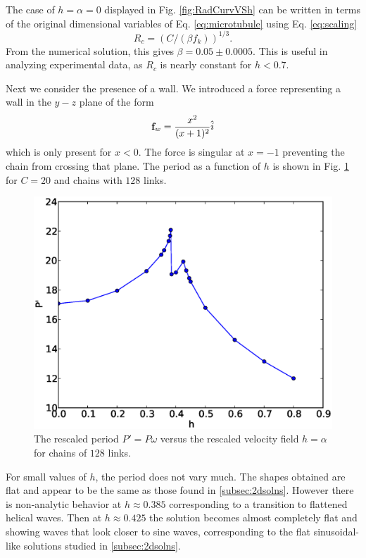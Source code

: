 \documentclass[11pt]{ucthesis}
\begin{document}
The case of $h = \alpha = 0$ displayed in Fig.  \ref{fig:RadCurvVSh} can be written in terms of the original
dimensional variables of Eq. \ref{eq:microtubule} using Eq.  \ref{eq:scaling}
\begin{equation}
\label{eq:R}
R_c =  (C/(\beta f_k))^{1/3}.
\end{equation}
From the numerical solution, this gives $\beta = 0.05 \pm 0.0005$. This is useful in analyzing experimental data, as
$R_c$ is nearly constant for $h < 0.7$.

Next we consider the presence of a wall. We introduced a force representing a wall in the $y-z$ plane of the form
\begin{equation}
\label{eq:wallforce}
{\bf f}_w =  \frac{x^2}{(x+1)^2} { \hat  i}  
\end{equation}
which is only present for $x < 0$. The force is singular at $x=-1$ preventing the chain from crossing that plane.
The period as a function of $h$ is shown in Fig. \ref{fig:WallPeriodVSh} for $C=20$ and chains with $128$ links.
\begin{figure}[htp]
\begin{center}
\includegraphics[width=\hsize]{wall_per_vs_h.eps}
\caption{ 
The rescaled period $P' = P\omega$ versus the rescaled velocity field $h=\alpha$
for chains of $128$ links.
}
\label{fig:WallPeriodVSh}
\end{center}
\end{figure}

For small values of $h$, the period does not vary much. The shapes obtained are flat and
appear to be the same as those found in \ref{subsec:2dsolns}. However there is non-analytic behavior at $h \approx 0.385$
corresponding to a transition to flattened helical waves. Then at $h \approx 0.425$ the solution becomes almost
completely flat and showing waves that look closer to sine waves, corresponding to the flat 
sinusoidal-like solutions studied in \ref{subsec:2dsolns}.
\end{document}
